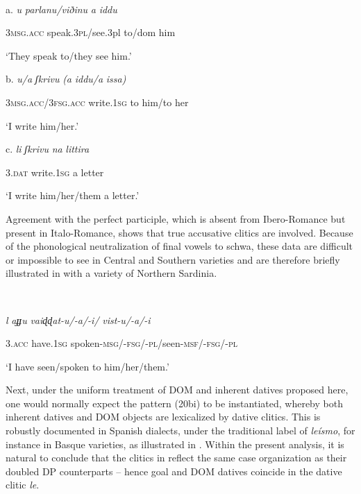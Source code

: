 \documentclass[output=paper]{langscibook}
\begin{document}
\ea\label{ex:manzini:}
{}\\
\z

a.  \textit{u}    \textit{parlanu/viðinu}   \textit{a}   \textit{iddu}

  \textsc{3msg.acc}  speak.\textsc{3pl}/see.3pl   to/dom him

‘They speak to/they see him.’        

  b.  \textit{u/a}       \textit{ʃkrivu}     \textit{(a} \textit{iddu/a} \textit{issa)}  

  \textsc{3msg.acc/3fsg.acc} write.\textsc{1sg}   to him/to her

‘I write him/her.’  

  c.  \textit{li}   \textit{ʃkrivu}     \textit{na} \textit{littira}        

\textsc{3.dat}   write.\textsc{1sg}   a letter   

‘I write him/her/them a letter.’           

Agreement with the perfect participle, which is absent from Ibero-Romance but present in Italo-Romance, shows that true accusative clitics are involved. Because of the phonological neutralization of final vowels to schwa, these data are difficult or impossible to see in Central and Southern varieties and are therefore briefly illustrated in  with a variety of Northern Sardinia.  

\ea\label{ex:manzini:}
{} \\
\z

\textit{l}    \textit{aɟɟu}     \textit{vaiɖɖat-u/-a/-i/}    \textit{vist-u/-a/-i}

   \textsc{3.acc}  have.\textsc{1sg}   spoken-\textsc{msg/-fsg/-pl/}seen-\textsc{msf/-fsg/-pl}  

‘I have seen/spoken to him/her/them.’        

Next, under the uniform treatment of DOM and inherent datives proposed here, one would normally expect the pattern (20bi) to be instantiated, whereby both inherent datives and DOM objects are lexicalized by dative clitics. This is robustly documented in Spanish dialects, under the traditional label of \textit{leísmo}, for instance in Basque varieties, as illustrated in .  Within the present analysis, it is natural to conclude that the clitics in  reflect the same case organization as their doubled DP counterparts – hence goal and DOM datives coincide in the dative clitic \textit{le}. 
\end{document}
